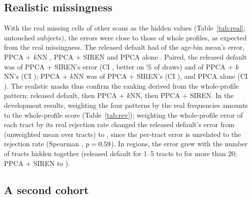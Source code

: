 \documentclass[11pt]{article}
\begin{document}
\subsection{Realistic missingness}\label{sec:real}

With the real missing cells of other scans as the hidden values (Table~\ref{tab:real}; untouched subjects), the
errors were close to those of whole profiles, as expected from the real missingness. The released default had
\eOneFinalReal{} of the age-bin mean's error, PPCA + $k$NN \eOneKnnReal, PPCA + SIREN \eOneDefReal{} and PPCA alone
\eOnePpcaReal. Paired, the released default was \eOneFinalVsDefReal{} of PPCA + SIREN's error (CI \eOneFinalVsDefRealCi,
better on \eOneFinalVsDefRealBetter\% of draws) and \eOneFinalVsKnnReal{} of PPCA + $k$NN's (CI \eOneFinalVsKnnRealCi);
PPCA + $k$NN was \eOneKnnVsDefReal{} of PPCA + SIREN's (CI \eOneKnnVsDefRealCi), and PPCA alone \eOnePpcaVsDefReal{} (CI
\eOnePpcaVsDefRealCi). The realistic masks thus confirm the ranking derived from the whole-profile pattern: released
default, then PPCA + $k$NN, then PPCA + SIREN. In the development results, weighting the four patterns by the real
frequencies amounts to the whole-profile score (Table~\ref{tab:rev}); weighting the whole-profile
error of each tract by its real rejection rate changed the released default's error from \trUFinal{} (unweighted mean
over tracts) to \trWFinal{}, since the per-tract error is unrelated to the rejection rate (Spearman \trRhoRej, $p =
0.59$). In regions, the error grew with the number of tracts hidden together (released default \loadFinalA{} for
1--5 tracts to \loadFinalE{} for more than 20; PPCA + SIREN \loadDefaultA{} to \loadDefaultE).

\begin{table}[t]
\centering\footnotesize
\caption{E2: error relative to the age-bin mean for the real-mask pattern (the real missing cells of a donor scan of the
same age bin and another subject).}\label{tab:real}
\resizebox{\textwidth}{!}{}
\end{table}

\subsection{A second cohort}\label{sec:pooling}
\end{document}

